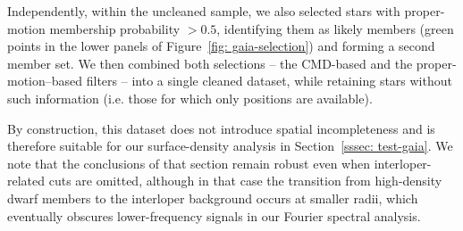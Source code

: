 \documentclass[fleqn,usenatbib]{mnras}
\begin{document}
Independently, within the uncleaned sample, we also selected stars with proper-motion membership probability $>0.5$, identifying them as likely members (green points in the lower panels of Figure~\ref{fig: gaia-selection}) and forming a second member set. We then combined both selections -- the CMD-based and the proper-motion–based filters -- into a single cleaned dataset, while retaining stars without such information (i.e. those for which only positions are available).

By construction, this dataset does not introduce spatial incompleteness and is therefore suitable for our surface-density analysis in Section~\ref{sssec: test-gaia}. We note that the conclusions of that section remain robust even when interloper-related cuts are omitted, although in that case the transition from high-density dwarf members to the interloper background occurs at smaller radii, which eventually obscures lower-frequency signals in our Fourier spectral analysis.


\bsp	%
\label{lastpage}
\end{document}
